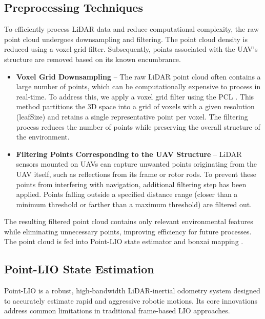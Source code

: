         \subsection{Preprocessing Techniques}
            To efficiently process \ac{LiDAR} data and reduce computational complexity, the raw point cloud undergoes downsampling and filtering. 
            The point cloud density is reduced using a voxel grid filter. 
            Subsequently, points associated with the \ac{UAV}'s structure are removed based on its known encumbrance.
            \begin{itemize}
                \item \textbf{Voxel Grid Downsampling} -- The raw \ac{LiDAR} point cloud often contains a large number of points, which can be computationally expensive to process in real-time. 
                To address this, we apply a voxel grid filter using the \ac{PCL} \cite{pcl_voxelgrid}. 
                This method partitions the 3D space into a grid of voxels with a given resolution (leafSize) and retains a single representative point per voxel. 
                The filtering process reduces the number of points while preserving the overall structure of the environment.
                \item \textbf{Filtering Points Corresponding to the UAV Structure} -- \ac{LiDAR} sensors mounted on \ac{UAV}s can capture unwanted points originating from the \ac{UAV} itself, such as reflections from its frame or rotor rods. 
                To prevent these points from interfering with navigation, additional filtering step has been applied.
                Points falling outside a specified distance range (closer than a minimum threshold or farther than a maximum threshold) are filtered out.
            \end{itemize}
            The resulting filtered point cloud contains only relevant environmental features while eliminating unnecessary points, improving efficiency for future processes.
            The point cloud is fed into \ac{Point-LIO} \cite{point_lio_paper} state estimator and bonxai mapping \cite{Bonxai2025}. 

        \subsection{Point-LIO State Estimation}
            \ac{Point-LIO} \cite{point_lio_paper} is a robust, high-bandwidth \ac{LiDAR}-inertial odometry system designed to accurately estimate rapid and aggressive robotic motions. 
            Its core innovations address common limitations in traditional frame-based LIO approaches.

